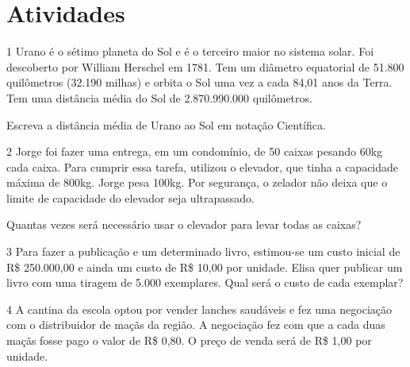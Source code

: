 \section*{Atividades}

\num{1} Urano é o sétimo planeta do Sol e é o terceiro maior no sistema
solar. Foi descoberto por William Herschel em 1781. Tem um diâmetro
equatorial de 51.800 quilômetros (32.190 milhas) e orbita o Sol uma vez
a cada 84,01 anos da Terra. Tem uma distância média do Sol de
2.870.990.000 quilômetros.

Escreva a distância média de Urano ao Sol em notação Científica.

\begin{emptybox}
\end{emptybox}

\num{2} Jorge foi fazer uma entrega, em um condomínio, de 50 caixas
pesando 60kg cada caixa. Para cumprir essa tarefa, utilizou o elevador,
que tinha a capacidade máxima de 800kg. Jorge pesa 100kg. Por segurança,
o zelador não deixa que o limite de capacidade do elevador seja ultrapassado.

Quantas vezes será necessário usar o elevador para levar todas as
caixas?

\begin{emptybox}
\end{emptybox}

\num{3} Para fazer a publicação e um determinado livro, estimou-se um
custo inicial de R\$ 250.000,00 e ainda um custo de R\$ 10,00 por
unidade. Elisa quer publicar um livro com uma tiragem de 5.000
exemplares. Qual será o custo de cada exemplar?

\begin{emptybox}
\end{emptybox}

\num{4} A cantina da escola optou por vender lanches saudáveis e fez uma
negociação com o distribuidor de maçãs da região. A negociação fez com
que a cada duas maçãs fosse pago o valor de R\$ 0,80. O preço
de venda será de R\$ 1,00 por unidade.

